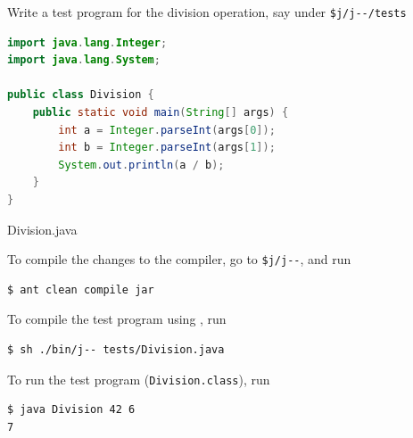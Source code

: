 \documentclass[8pt,a4paper,compress]{beamer}
\begin{document}
\begin{frame}[fragile]
\pause

Write a test program for the division operation, say under \lstinline{$j/j--/tests}

\begin{tcolorbox}[enhanced,drop shadow southwest,sharp corners,size=fbox,colback=white,fontlower=\small\ttfamily,collower=silver900]

\begin{lstlisting}[language=Java,style=focusin]
import java.lang.Integer;
import java.lang.System;

public class Division {
    public static void main(String[] args) {
        int a = Integer.parseInt(args[0]);
        int b = Integer.parseInt(args[1]);
        System.out.println(a / b);
    }
}
\end{lstlisting}

\tcblower
\begin{minipage}[t][.25cm][t]{\textwidth}
Division.java
\end{minipage}
\end{tcolorbox}

\pause\bigskip

To compile the changes to the \jmm compiler, go to \lstinline{$j/j--}, and run

\begin{tcolorbox}[enhanced,drop shadow southwest,sharp corners,size=fbox,colback=black]
\begin{lstlisting}[style=terminal]
$ ant clean compile jar
\end{lstlisting}
\end{tcolorbox}

\pause\bigskip

To compile the test program using \jmm, run

\begin{tcolorbox}[enhanced,drop shadow southwest,sharp corners,size=fbox,colback=black]
\begin{lstlisting}[style=terminal]
$ sh ./bin/j-- tests/Division.java
\end{lstlisting}
\end{tcolorbox}

\pause\bigskip

To run the test program (\lstinline{Division.class}), run

\begin{tcolorbox}[enhanced,drop shadow southwest,sharp corners,size=fbox,colback=black]
\begin{lstlisting}[style=terminal]
$ java Division 42 6
7
\end{lstlisting}
\end{tcolorbox}
\end{frame}
\end{document}
